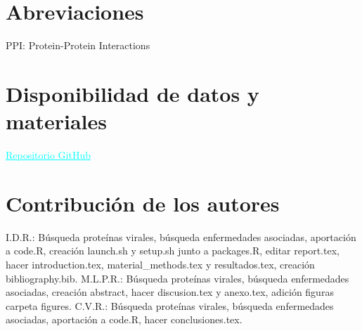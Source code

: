 \documentclass{bmcart}
\begin{document}
	\begin{backmatter}
	
		\section*{Abreviaciones}%
			
			PPI: Protein-Protein Interactions
		
		\section*{Disponibilidad de datos y materiales}%
			
			\href{https://github.com/Ines-Diaz/project_template}{\textcolor{Cyan}{\underline{Repositorio GitHub}}}
		
		\section*{Contribución de los autores}
			
			 I.D.R.: Búsqueda proteínas virales, búsqueda enfermedades asociadas, aportación a code.R, creación launch.sh y setup.sh junto a packages.R, editar report.tex, hacer introduction.tex, material\_methods.tex y resultados.tex, creación bibliography.bib.
			 \newline
			 M.L.P.R.: Búsqueda proteínas virales, búsqueda enfermedades asociadas, creación abstract, hacer discusion.tex y anexo.tex, adición figuras carpeta figures.
			 \newline
			 C.V.R.: Búsqueda proteínas virales, búsqueda enfermedades asociadas, aportación a code.R, hacer conclusiones.tex.
		
		
		
	
	\end{backmatter}
\end{document}
